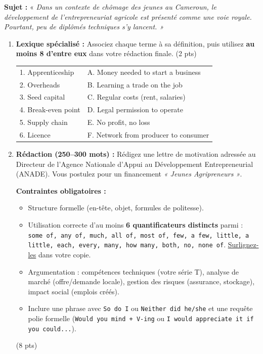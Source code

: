 \documentclass[11pt]{article}
\begin{document}
\begin{exercice}
\textbf{Sujet :} « \textit{Dans un contexte de chômage des jeunes au Cameroun, le développement de l'entrepreneuriat agricole est présenté comme une voie royale. Pourtant, peu de diplômés techniques s'y lancent. »}

\begin{enumerate}
    \item \textbf{Lexique spécialisé :} Associez chaque terme à sa définition, puis utilisez \textbf{au moins 8 d'entre eux} dans votre rédaction finale. (2 pts)
    \begin{tabular}{ll}
    1. Apprenticeship & A. Money needed to start a business \\
    2. Overheads       & B. Learning a trade on the job \\
    3. Seed capital    & C. Regular costs (rent, salaries) \\
    4. Break-even point& D. Legal permission to operate \\
    5. Supply chain    & E. No profit, no loss \\
    6. Licence         & F. Network from producer to consumer \\
    \end{tabular}

    \item \textbf{Rédaction (250–300 mots) :} Rédigez une lettre de motivation adressée au Directeur de l'Agence Nationale d'Appui au Développement Entrepreneurial (ANADE). Vous postulez pour un financement \textit{« Jeunes Agripreneurs »}.
    
    \textbf{Contraintes obligatoires :}
    \begin{itemize}
        \item Structure formelle (en-tête, objet, formules de politesse).
        \item Utilisation correcte d'au moins \textbf{6 quantificateurs distincts} parmi : \texttt{some of, any of, much, all of, most of, few, a few, little, a little, each, every, many, how many, both, no, none of}. \underline{Surlignez-les} dans votre copie.
        \item Argumentation : compétences techniques (votre série T), analyse de marché (offre/demande locale), gestion des risques (assurance, stockage), impact social (emplois créés).
        \item Inclure une phrase avec \texttt{So do I} ou \texttt{Neither did he/she} et une requête polie formelle (\texttt{Would you mind + V-ing} ou \texttt{I would appreciate it if you could...}).
    \end{itemize}
    (8 pts)
\end{enumerate}
\end{exercice}
\end{document}

